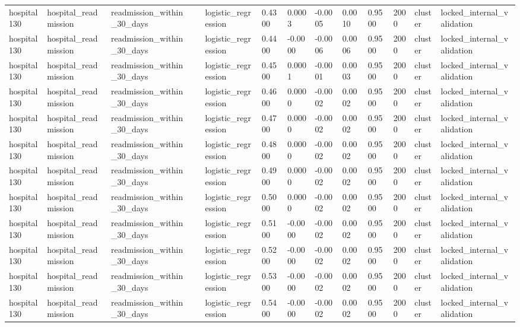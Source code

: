 \begin{tabular}{lllllllllllll}
hospital130 & hospital\_readmission & readmission\_within\_30\_days &  & logistic\_regression & 0.4300 & 0.0003 & -0.0005 & 0.0010 & 0.9500 & 2000 & cluster & locked\_internal\_validation \\
hospital130 & hospital\_readmission & readmission\_within\_30\_days &  & logistic\_regression & 0.4400 & -0.0000 & -0.0006 & 0.0006 & 0.9500 & 2000 & cluster & locked\_internal\_validation \\
hospital130 & hospital\_readmission & readmission\_within\_30\_days &  & logistic\_regression & 0.4500 & 0.0001 & -0.0001 & 0.0003 & 0.9500 & 2000 & cluster & locked\_internal\_validation \\
hospital130 & hospital\_readmission & readmission\_within\_30\_days &  & logistic\_regression & 0.4600 & 0.0000 & -0.0002 & 0.0002 & 0.9500 & 2000 & cluster & locked\_internal\_validation \\
hospital130 & hospital\_readmission & readmission\_within\_30\_days &  & logistic\_regression & 0.4700 & 0.0000 & -0.0002 & 0.0002 & 0.9500 & 2000 & cluster & locked\_internal\_validation \\
hospital130 & hospital\_readmission & readmission\_within\_30\_days &  & logistic\_regression & 0.4800 & 0.0000 & -0.0002 & 0.0002 & 0.9500 & 2000 & cluster & locked\_internal\_validation \\
hospital130 & hospital\_readmission & readmission\_within\_30\_days &  & logistic\_regression & 0.4900 & 0.0000 & -0.0002 & 0.0002 & 0.9500 & 2000 & cluster & locked\_internal\_validation \\
hospital130 & hospital\_readmission & readmission\_within\_30\_days &  & logistic\_regression & 0.5000 & 0.0000 & -0.0002 & 0.0002 & 0.9500 & 2000 & cluster & locked\_internal\_validation \\
hospital130 & hospital\_readmission & readmission\_within\_30\_days &  & logistic\_regression & 0.5100 & -0.0000 & -0.0002 & 0.0002 & 0.9500 & 2000 & cluster & locked\_internal\_validation \\
hospital130 & hospital\_readmission & readmission\_within\_30\_days &  & logistic\_regression & 0.5200 & -0.0000 & -0.0002 & 0.0002 & 0.9500 & 2000 & cluster & locked\_internal\_validation \\
hospital130 & hospital\_readmission & readmission\_within\_30\_days &  & logistic\_regression & 0.5300 & -0.0000 & -0.0002 & 0.0002 & 0.9500 & 2000 & cluster & locked\_internal\_validation \\
hospital130 & hospital\_readmission & readmission\_within\_30\_days &  & logistic\_regression & 0.5400 & -0.0000 & -0.0002 & 0.0002 & 0.9500 & 2000 & cluster & locked\_internal\_validation \\

\end{tabular}
